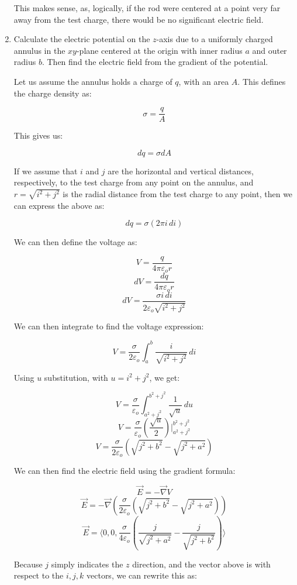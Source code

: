 \begin{enumerate}
      This makes sense, as, logically, if the rod were centered at a point very far away from the test charge, there would be no significant electric field.
    
  \item Calculate the electric potential on the $z$-axis due to a uniformly charged annulus in the $xy$-plane centered at the origin with inner radius $a$ and outer radius $b$. Then find the electric field from the gradient of the potential.

    Let us assume the annulus holds a charge of $q$, with an area $A$. This defines the charge density as:

    $$\sigma=\frac{q}{A}$$

    This gives us:

    $$dq=\sigma dA$$

    If we assume that $i$ and $j$ are the horizontal and vertical distances, respectively, to the test charge from any point on the annulus, and $r=\sqrt{i^2+j^2}$ is the radial distance from the test charge to any point, then we can express the above as:

    $$dq=\sigma (2\pi i\,di)$$

    We can then define the voltage as:

    $$V=\frac{q}{4\pi\varepsilon_o r}$$
    $$dV=\frac{dq}{4\pi\varepsilon_o r}$$
    $$dV=\frac{\sigma i\,di}{2\varepsilon_o\sqrt{i^2+j^2}}$$

    We can then integrate to find the voltage expression:

    $$V=\frac{\sigma}{2\varepsilon_o}\int_a^b\frac{i}{\sqrt{i^2+j^2}}\,di$$

    Using $u$ substitution, with $u=i^2+j^2$, we get:

    $$V=\frac{\sigma}{\varepsilon_o}\int_{a^2+j^2}^{b^2+j^2}\frac{1}{\sqrt{u}}\,du$$
    $$V=\frac{\sigma}{\varepsilon_o}\left(  \frac{\sqrt{u}}{2}\right)\Big|_{a^2+j^2}^{b^2+j^2}$$
    $$V=\frac{\sigma}{2\varepsilon_o}\left(  \sqrt{j^2+b^2}-\sqrt{j^2+a^2}\right)$$

    We can then find the electric field using the gradient formula:

    $$\vec{E}=-\vec{\nabla}V$$
    $$\vec{E}=-\vec{\nabla}\left(  \frac{\sigma}{2\varepsilon_o}\left(  \sqrt{j^2+b^2}-\sqrt{j^2+a^2}\right) \right)$$
    $$\boxed{\vec{E}=\langle 0, 0, \frac{\sigma}{4\varepsilon_o}\left( \frac{j}{\sqrt{j^2+a^2}}-\frac{j}{\sqrt{j^2+b^2}} \right)\rangle}$$

    Because $j$ simply indicates the $z$ direction, and the vector above is with respect to the $i,j,k$ vectors, we can rewrite this as:


\end{enumerate}
